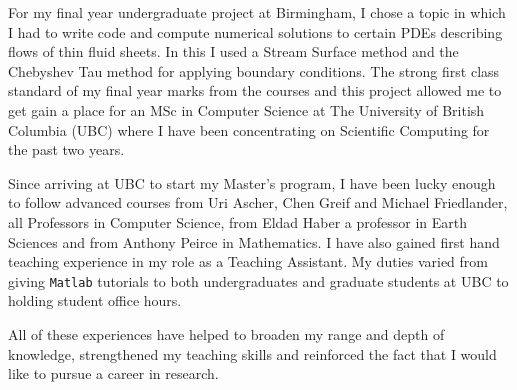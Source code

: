 \documentclass[12pt]{article}
\numberwithin{equation}{section}    %
\begin{document}
For my final year undergraduate project at Birmingham, I chose a topic in which I had to write code and compute numerical solutions to certain PDEs describing flows of thin fluid sheets. In this I used a Stream Surface method and the Chebyshev Tau method for applying boundary conditions. The strong first class standard of my final year marks from the courses and this project allowed me to get gain a place for an MSc in Computer Science at The University of British Columbia (UBC) where I have been concentrating on Scientific Computing for the past two years.
\smallskip

Since arriving at UBC to start my Master's program, I have been lucky enough to follow advanced courses from Uri Ascher, Chen Greif and Michael Friedlander, all Professors in Computer Science, from Eldad Haber a professor in Earth Sciences and from Anthony Peirce in Mathematics. I have also gained first hand teaching experience in my role as a Teaching Assistant. My duties varied from giving {\tt{Matlab}} tutorials to both undergraduates and graduate students at UBC to holding student office hours.
\smallskip

All of these experiences have helped to broaden my range and depth of knowledge, strengthened my teaching skills and reinforced the fact that I would like to pursue a career in research.
\end{document}
